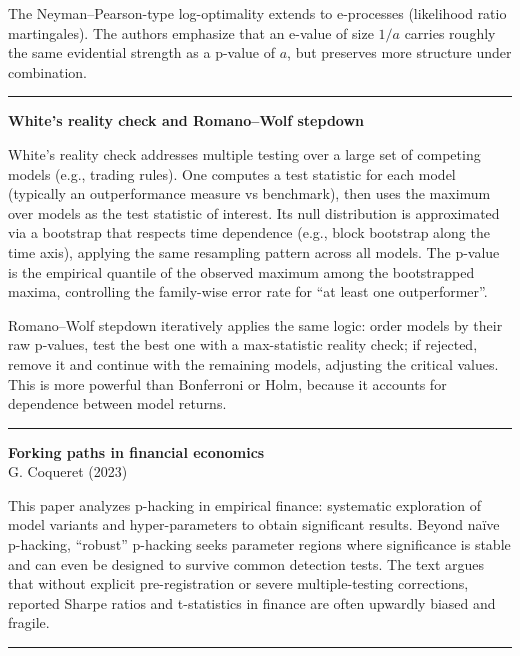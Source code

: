 \documentclass[a5paper]{article}
\begin{document}
The Neyman--Pearson-type log-optimality extends to e-processes
(likelihood ratio martingales). The authors emphasize that an e-value of
size $1/a$ carries roughly the same evidential strength as a p-value of $a$,
but preserves more structure under combination.

\begin{center}\rule{0.5\linewidth}{0.5pt}\end{center}

\textbf{White's reality check and Romano--Wolf stepdown}

White's reality check addresses multiple testing over a large set of
competing models (e.g., trading rules). One computes a test statistic
for each model (typically an outperformance measure vs benchmark), then
uses the maximum over models as the test statistic of interest. Its null
distribution is approximated via a bootstrap that respects time
dependence (e.g., block bootstrap along the time axis), applying the
same resampling pattern across all models. The p-value is the empirical
quantile of the observed maximum among the bootstrapped maxima,
controlling the family-wise error rate for ``at least one
outperformer''.

Romano--Wolf stepdown iteratively applies the same logic: order models
by their raw p-values, test the best one with a max-statistic reality
check; if rejected, remove it and continue with the remaining models,
adjusting the critical values. This is more powerful than Bonferroni or
Holm, because it accounts for dependence between model returns.

\begin{center}\rule{0.5\linewidth}{0.5pt}\end{center}

\textbf{Forking paths in financial economics}\\
G. Coqueret (2023)

This paper analyzes p-hacking in empirical finance: systematic
exploration of model variants and hyper-parameters to obtain significant
results. Beyond naïve p-hacking, ``robust'' p-hacking seeks parameter
regions where significance is stable and can even be designed to survive
common detection tests. The text argues that without explicit
pre-registration or severe multiple-testing corrections, reported Sharpe
ratios and t-statistics in finance are often upwardly biased and
fragile.

\begin{center}\rule{0.5\linewidth}{0.5pt}\end{center}
\end{document}
